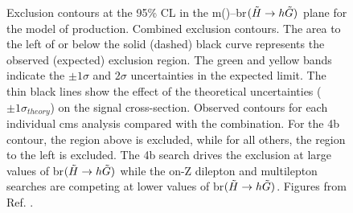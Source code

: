 \begin{figure}[htbp]
	\centering 
	\caption{
	Exclusion contours at the 95\% CL in the m(\ninoone)--\gls{br}$(\tilde{H}\rightarrow h \tilde{G})$ plane for the model of \ninoone\ninoone production.
	Combined exclusion contours. The area to the left of or below the solid (dashed) black curve represents the observed (expected) exclusion region. The green and yellow bands indicate the $\pm1\sigma$ and $2\sigma$ uncertainties in the expected limit. The thin black lines show the effect of the theoretical uncertainties ($\pm1\sigma_{theory}$) on the signal cross-section.
	Observed contours for each individual \gls{cms} analysis compared with the combination. For the 4b contour, the region above is excluded, while for all others, the region to the left is excluded. The 4b search drives the exclusion at large values of \gls{br}$(\tilde{H}\rightarrow h \tilde{G})$ while the on-Z dilepton and multilepton searches are competing at lower values of \gls{br}$(\tilde{H}\rightarrow h \tilde{G})$.
	Figures from Ref. \cite{Sirunyan:2018ubx}.
		}
	\label{fig:limits_higgsino_cms}
\end{figure}

